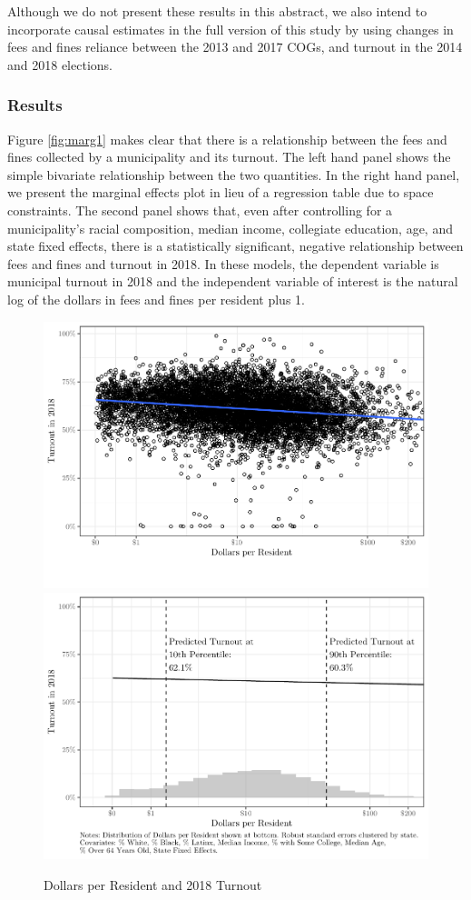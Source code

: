 \documentclass[
  12pt,
]{article}
\begin{document}
Although we do not present these results in this abstract, we also intend to incorporate causal estimates in the full version of this study by using changes in fees and fines reliance between the 2013 and 2017 COGs, and turnout in the 2014 and 2018 elections.

\hypertarget{results}{%
\subsubsection*{Results}\label{results}}

Figure \ref{fig:marg1} makes clear that there is a relationship between the fees and fines collected by a municipality and its turnout. The left hand panel shows the simple bivariate relationship between the two quantities. In the right hand panel, we present the marginal effects plot in lieu of a regression table due to space constraints. The second panel shows that, even after controlling for a municipality's racial composition, median income, collegiate education, age, and state fixed effects, there is a statistically significant, negative relationship between fees and fines and turnout in 2018. In these models, the dependent variable is municipal turnout in 2018 and the independent variable of interest is the natural log of the dollars in fees and fines per resident plus 1.

\begin{figure}[H]
\includegraphics[width=0.5\linewidth]{fees_fines_to_files/figure-latex/figures-side-1} \includegraphics[width=0.5\linewidth]{fees_fines_to_files/figure-latex/figures-side-2} \caption{\label{fig:marg1}Dollars per Resident and 2018 Turnout}\label{fig:figures-side}
\end{figure}
\end{document}
